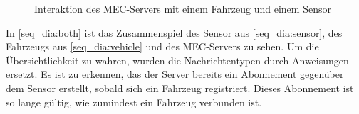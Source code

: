 \begin{figure}[H]
	\centering
	\caption{Interaktion des MEC-Servers mit einem Fahrzeug und einem Sensor}
	\label{seq_dia:both}
\end{figure}

In \autoref{seq_dia:both} ist das Zusammenspiel des Sensor aus \autoref{seq_dia:sensor}, des Fahrzeugs aus \autoref{seq_dia:vehicle} und des MEC-Servers zu sehen.
Um die Übersichtlichkeit zu wahren, wurden die Nachrichtentypen durch Anweisungen ersetzt.
Es ist zu erkennen, das der Server bereits ein Abonnement gegenüber dem Sensor erstellt, sobald sich ein Fahrzeug registriert.
Dieses Abonnement ist so lange gültig, wie zumindest ein Fahrzeug verbunden ist.
